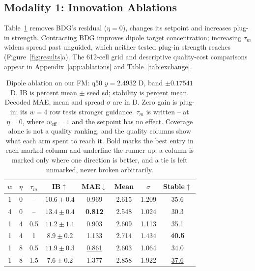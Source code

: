 \documentclass{article}
\begin{document}
\subsection{Modality 1: Innovation Ablations}\label{sec:ablations}
Table~\ref{tab:ablation} removes BDG's residual ($\eta=0$), changes its setpoint and increases plug-in strength. Contracting BDG improves dipole target concentration; increasing $\tau_m$ widens spread past unguided, which neither tested plug-in strength reaches (Figure~\ref{fig:results}a). The 612-cell grid and descriptive quality-cost comparisons appear in Appendix~\ref{app:ablations} and Table~\ref{tab:exchange}.
\begin{table}[!htbp]
\centering\small
\caption{Dipole ablation on our FM: q50 $y=2.4932$ D, band $\pm0.17541$ D. IB is percent mean $\pm$ seed sd; stability is percent mean. Decoded MAE, mean and spread $\sigma$ are in D. Zero gain is plug-in; its $w=4$ row tests stronger guidance. $\tau_m$ is written -- at $\eta=0$, where $w_{\mathrm{eff}}=1$ and the setpoint has no effect. Coverage alone is not a quality ranking, and the quality columns show what each arm spent to reach it. Bold marks the best entry in each marked column and underline the runner-up; a column is marked only where one direction is better, and a tie is left unmarked, never broken arbitrarily.}
\label{tab:ablation}
\begin{tabular}{cccccccc}
\toprule
$w$ & $\eta$ & $\tau_m$ & IB$\uparrow$ & MAE$\downarrow$ & Mean & $\sigma$ & Stable$\uparrow$\\
\midrule
1 & 0 & -- & $10.6\pm0.4$ & 0.969 & 2.615 & 1.209 & 35.6\\
4 & 0 & -- & $\mathbf{13.4\pm0.4}$& \textbf{0.812}& 2.548 & 1.024 & 30.3\\
1 & 4 & 0.5 & $11.2\pm1.1$ & 0.903 & 2.609 & 1.113 & 35.1\\
1 & 4 & 1 & $8.9\pm0.2$ & 1.133 & 2.714 & 1.434 & \textbf{40.5}\\
1 & 8 & 0.5 & $\underline{11.9\pm0.3}$& \underline{0.861}& 2.603 & 1.064 & 34.0\\
1 & 8 & 1.5 & $7.6\pm0.2$ & 1.377 & 2.858 & 1.922 & \underline{37.6}\\
\bottomrule
\end{tabular}
\end{table}
\end{document}
